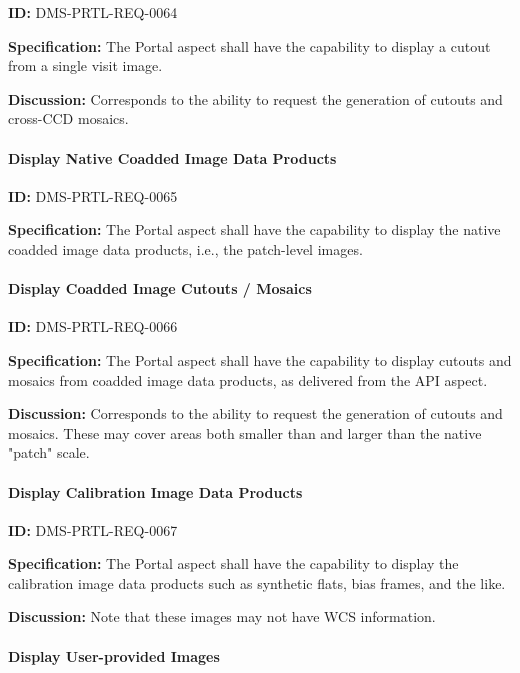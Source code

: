 \documentclass[SE,toc,lsstdraft]{lsstdoc}
\begin{document}
\label{DMS-PRTL-REQ-0064}
\textbf{ID:} DMS-PRTL-REQ-0064

\textbf{Specification:}
The Portal aspect shall have the capability to display a cutout from a single visit image.

\textbf{Discussion:}
Corresponds to the ability to request the generation of cutouts and cross-CCD mosaics.

\paragraph{Display Native Coadded Image Data Products}\hfill  %

\label{DMS-PRTL-REQ-0065}
\textbf{ID:} DMS-PRTL-REQ-0065

\textbf{Specification:}
The Portal aspect shall have the capability to display the native coadded image data products, i.e., the patch-level images.

\paragraph{Display Coadded Image Cutouts / Mosaics}\hfill  %

\label{DMS-PRTL-REQ-0066}
\textbf{ID:} DMS-PRTL-REQ-0066

\textbf{Specification:}
The Portal aspect shall have the capability to display cutouts and mosaics from coadded image data products, as delivered from the API aspect.

\textbf{Discussion:}
Corresponds to the ability to request the generation of cutouts and mosaics.  These may cover areas both smaller than and larger than the native "patch" scale.

\paragraph{Display Calibration Image Data Products}\hfill  %

\label{DMS-PRTL-REQ-0067}
\textbf{ID:} DMS-PRTL-REQ-0067

\textbf{Specification:}
The Portal aspect shall have the capability to display the calibration image data products such as synthetic flats, bias frames, and the like.

\textbf{Discussion:}
Note that these images may not have WCS information.

\paragraph{Display User-provided Images}\hfill  %
\end{document}

